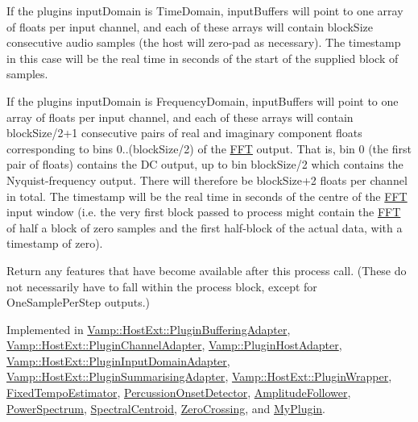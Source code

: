 If the plugin\textquotesingle{}s input\+Domain is Time\+Domain, input\+Buffers will point to one array of floats per input channel, and each of these arrays will contain block\+Size consecutive audio samples (the host will zero-\/pad as necessary). The timestamp in this case will be the real time in seconds of the start of the supplied block of samples.

If the plugin\textquotesingle{}s input\+Domain is Frequency\+Domain, input\+Buffers will point to one array of floats per input channel, and each of these arrays will contain block\+Size/2+1 consecutive pairs of real and imaginary component floats corresponding to bins 0..(block\+Size/2) of the \hyperlink{class_vamp_1_1_f_f_t}{F\+FT} output. That is, bin 0 (the first pair of floats) contains the DC output, up to bin block\+Size/2 which contains the Nyquist-\/frequency output. There will therefore be block\+Size+2 floats per channel in total. The timestamp will be the real time in seconds of the centre of the \hyperlink{class_vamp_1_1_f_f_t}{F\+FT} input window (i.\+e. the very first block passed to process might contain the \hyperlink{class_vamp_1_1_f_f_t}{F\+FT} of half a block of zero samples and the first half-\/block of the actual data, with a timestamp of zero).

Return any features that have become available after this process call. (These do not necessarily have to fall within the process block, except for One\+Sample\+Per\+Step outputs.) 

Implemented in \hyperlink{class_vamp_1_1_host_ext_1_1_plugin_buffering_adapter_a262206b978d9de28ee4bb35f437e915e}{Vamp\+::\+Host\+Ext\+::\+Plugin\+Buffering\+Adapter}, \hyperlink{class_vamp_1_1_host_ext_1_1_plugin_channel_adapter_a294e663b4d9ec885791faa1b440571ed}{Vamp\+::\+Host\+Ext\+::\+Plugin\+Channel\+Adapter}, \hyperlink{class_vamp_1_1_plugin_host_adapter_a82c29a512c0587ea0121eee4b0c2a684}{Vamp\+::\+Plugin\+Host\+Adapter}, \hyperlink{class_vamp_1_1_host_ext_1_1_plugin_input_domain_adapter_a0867737693c16801d40a6adbde07ec07}{Vamp\+::\+Host\+Ext\+::\+Plugin\+Input\+Domain\+Adapter}, \hyperlink{class_vamp_1_1_host_ext_1_1_plugin_summarising_adapter_ab375afa4d24bafd57b838fee1767359f}{Vamp\+::\+Host\+Ext\+::\+Plugin\+Summarising\+Adapter}, \hyperlink{class_vamp_1_1_host_ext_1_1_plugin_wrapper_afca78043c2843c1d45019983515e23f7}{Vamp\+::\+Host\+Ext\+::\+Plugin\+Wrapper}, \hyperlink{class_fixed_tempo_estimator_a1cf76b0e55cf4ed3da095cffcdeaec3c}{Fixed\+Tempo\+Estimator}, \hyperlink{class_percussion_onset_detector_adfd989812b3e0cb8f4b498f56a5a9614}{Percussion\+Onset\+Detector}, \hyperlink{class_amplitude_follower_a48d0f95cac31ffd190cff89b50a2a5bd}{Amplitude\+Follower}, \hyperlink{class_power_spectrum_aa5664ffc2b37a16db471fae791c1f55f}{Power\+Spectrum}, \hyperlink{class_spectral_centroid_aca96c70e7e75c9e4a7db38485018914c}{Spectral\+Centroid}, \hyperlink{class_zero_crossing_abf4aaa6fd8cc03de63f4e1e8942633da}{Zero\+Crossing}, and \hyperlink{class_my_plugin_ac2fc9b4ea10d472211bd319ecd870611}{My\+Plugin}.

